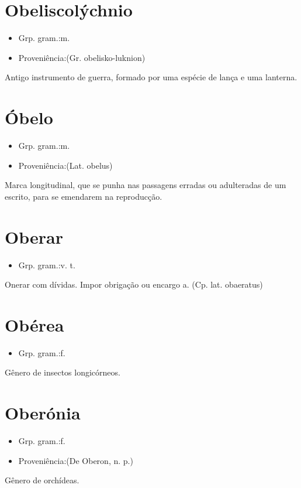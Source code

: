 \section{Obeliscolýchnio}
\begin{itemize}
\item {Grp. gram.:m.}
\end{itemize}
\begin{itemize}
\item {Proveniência:(Gr. \textunderscore obelisko-luknion\textunderscore )}
\end{itemize}
Antigo instrumento de guerra, formado por uma espécie de lança e uma lanterna.
\section{Óbelo}
\begin{itemize}
\item {Grp. gram.:m.}
\end{itemize}
\begin{itemize}
\item {Proveniência:(Lat. \textunderscore obelus\textunderscore )}
\end{itemize}
Marca longitudinal, que se punha nas passagens erradas ou adulteradas de um escrito, para se emendarem na reproducção.
\section{Oberar}
\begin{itemize}
\item {Grp. gram.:v. t.}
\end{itemize}
Onerar com dívidas.
Impor obrigação ou encargo a.
(Cp. lat. \textunderscore obaeratus\textunderscore )
\section{Obérea}
\begin{itemize}
\item {Grp. gram.:f.}
\end{itemize}
Gênero de insectos longicórneos.
\section{Oberónia}
\begin{itemize}
\item {Grp. gram.:f.}
\end{itemize}
\begin{itemize}
\item {Proveniência:(De \textunderscore Oberon\textunderscore , n. p.)}
\end{itemize}
Gênero de orchídeas.

